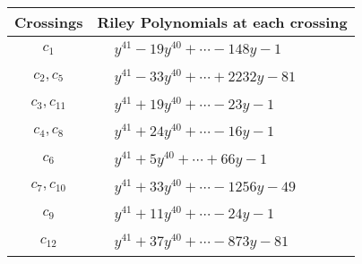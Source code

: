 \documentclass[1p]{elsarticle_modified}
\theoremstyle{definition}
\begin{document}
\begin{tabular}{m{50pt}|m{274pt}}
Crossings & \hspace{64pt}Riley Polynomials at each crossing \\
\hline $$\begin{aligned}c_{1}\end{aligned}$$&$\begin{aligned}
&y^{41}-19 y^{40}+\cdots-148 y-1
\end{aligned}$\\
\hline $$\begin{aligned}c_{2},c_{5}\end{aligned}$$&$\begin{aligned}
&y^{41}-33 y^{40}+\cdots+2232 y-81
\end{aligned}$\\
\hline $$\begin{aligned}c_{3},c_{11}\end{aligned}$$&$\begin{aligned}
&y^{41}+19 y^{40}+\cdots-23 y-1
\end{aligned}$\\
\hline $$\begin{aligned}c_{4},c_{8}\end{aligned}$$&$\begin{aligned}
&y^{41}+24 y^{40}+\cdots-16 y-1
\end{aligned}$\\
\hline $$\begin{aligned}c_{6}\end{aligned}$$&$\begin{aligned}
&y^{41}+5 y^{40}+\cdots+66 y-1
\end{aligned}$\\
\hline $$\begin{aligned}c_{7},c_{10}\end{aligned}$$&$\begin{aligned}
&y^{41}+33 y^{40}+\cdots-1256 y-49
\end{aligned}$\\
\hline $$\begin{aligned}c_{9}\end{aligned}$$&$\begin{aligned}
&y^{41}+11 y^{40}+\cdots-24 y-1
\end{aligned}$\\
\hline $$\begin{aligned}c_{12}\end{aligned}$$&$\begin{aligned}
&y^{41}+37 y^{40}+\cdots-873 y-81
\end{aligned}$\\
\hline
\end{tabular}\\~\\
\end{document}
